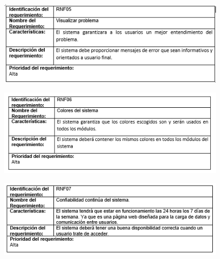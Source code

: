 \begin{figure}[htb]
\begin{center}
\includegraphics[width=11cm]{./imagenes/tablas/RNF05.png}
\end{center}

\end{figure}





\begin{figure}[htb]
\begin{center}
\includegraphics[width=11cm]{./imagenes/tablas/RNF06.png}
\end{center}

\end{figure}

\newpage



\begin{figure}[htb]
\begin{center}
\includegraphics[width=11cm]{./imagenes/tablas/RNF07.png}
\end{center}

\end{figure}





